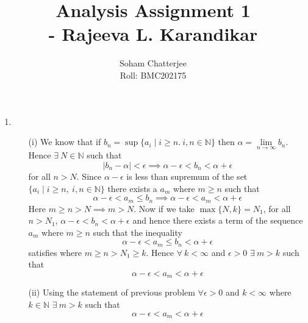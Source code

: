 \documentclass{article}
\title{\huge{Analysis Assignment 1\\ \hspace{5cm}- Rajeeva L. Karandikar}}
\author{Soham Chatterjee\\Roll: BMC202175}
\date{}
\begin{document}
	\maketitle\pagebreak
\begin{enumerate}
\item \begin{enumerate}
	\item[(i)] We know that if $b_n=\sup\{a_i\mid i\geq n.\ i,n\in\mathbb{N}\}$ then $\alpha=\lim\limits_{n\to\infty}b_n$. Hence $\exists \ N\in\mathbb{N}$ such that $$|b_n-\alpha|<\epsilon\implies \alpha-\epsilon<b_n<\alpha+\epsilon$$for all $n>N$. Since $\alpha-\epsilon$ is less than supremum of the set $\{a_i\mid i\geq n,\ i,n\in\mathbb{N}\}$ there exists a $a_m$ where $m\geq n$ such that $$\alpha-\epsilon<a_m\leq b_n\implies\alpha-\epsilon<a_m<\alpha+\epsilon$$Here $m\geq n>N\implies m>N$. Now if we take $\max\{N,k\}=N_1$, for all $n>N_1$, $ \alpha-\epsilon<b_n<\alpha+\epsilon$ and hence there exists a term of the sequence $a_m$ where $m\geq n$ such that the inequality  $$\alpha-\epsilon<a_m\leq b_n<\alpha+\epsilon$$satisfies where $m\geq n>N_1\geq k$. Hence $\forall\ k<\infty$ and $\epsilon>0$ $\exists\ m>k$ such that $$\alpha-\epsilon<a_m<\alpha+\epsilon$$
	\item[(ii)]Using the statement of previous problem $\forall \epsilon>0$ and $k<\infty$ where $k\in\mathbb{N}$ $\exists \ m>k$ such that $$\alpha-\epsilon<a_m<\alpha+\epsilon$$
	

\end{enumerate}
\end{enumerate}
\end{document}
